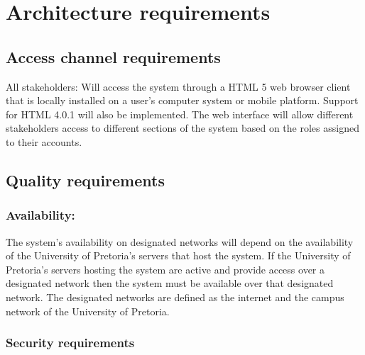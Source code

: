 \documentclass[12pt]{article}
\begin{document}
\newpage
\section{Architecture requirements}
\subsection{Access channel requirements} %
\vspace{0.2in}
All stakeholders: Will access the system through a HTML 5 web browser client that is locally installed on a user's computer system or mobile platform. Support for HTML 4.0.1 will also be implemented. The web interface will allow different stakeholders access to different sections of the system based on the roles assigned to their accounts.

\vspace{0.2in}

\subsection{Quality requirements} %
\vspace{0.2in}

\subsubsection{Availability:}

\begin{flushleft}

The system's availability on designated networks will depend on the availability of the University of Pretoria's servers that host the system. If the University of Pretoria's servers hosting the system are active and provide access over a designated network then the system must be available over that designated network. The designated networks are defined as the internet and the campus network of the University of Pretoria.

\end{flushleft}

\vspace{0.1in}

\subsubsection{Security requirements}
\end{document}
